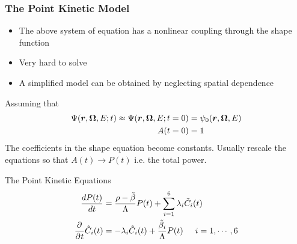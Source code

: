 \documentclass[10pt,compress]{beamer}
\begin{document}
\begin{frame}\frametitle{The Point Kinetic Model}
    \begin{itemize}
        \item The above system of equation has a nonlinear coupling through the shape function
        \item Very hard to solve
        \item A simplified model can be obtained by neglecting spatial dependence
    \end{itemize}
    Assuming that
    \begin{equation}
        \begin{split}
            \Psi(\boldsymbol{r}, \boldsymbol{\Omega}, E;t) \approx \Psi(\boldsymbol{r}, \boldsymbol{\Omega}, E;t=0) &= \psi_0(\boldsymbol{r}, \boldsymbol{\Omega}, E)\nonumber\\
            A(t=0)&=1
        \end{split}
    \end{equation}
    The coefficients in the shape equation become constants. Usually rescale the equations so that $A(t)\to P(t)$ i.e. the total power.
    \begin{block}{The Point Kinetic Equations}
        \begin{equation}
            \begin{split}
                \frac{dP(t)}{dt} &= \frac{\rho- \tilde{\beta}}{\Lambda}P(t) + \sum_{i=1}^6\lambda_i \tilde{C}_i(t)\nonumber\\
                \frac{\partial^{} }{\partial^{} t}\tilde{C}_i(t) &= -\lambda_i \tilde{C}_i(t) + \frac{\tilde{\beta}_i}{\Lambda}P(t)\hspace{5mm} i=1,\cdots, 6
            \end{split}
        \end{equation}
    \end{block}
\end{frame}
\end{document}
